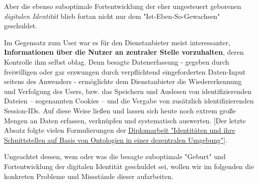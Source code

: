 \vspace{0.3cm}

Aber die ebenso suboptimale Fortentwicklung der eher ungesteuert geborenen \textit{digitalen Identität} blieb fortan nicht nur dem "Ist-Eben-So-Gewachsen" geschuldet.

Im Gegensatz zum User war es für den Dienstanbieter meist interessanter, \textbf{Informationen über die Nutzer an zentraler Stelle vorzuhalten}, deren Kontrolle ihm selbst oblag. Denn besagte Datenerfassung - gegeben durch freiwilligen oder gar erzwungen durch verpflichtend eingeforderten Daten-Input seitens des Anwenders - ermöglichte dem Dienstanbieter die Wiedererkennung und Verfolgung des Users, bzw. das Speichern und Auslesen von identifizierenden Dateien – sogenannten Cookies – und die Vergabe von zusätzlich identifizierenden Session-IDs. Auf diese Weise ließen und lassen sich heute noch extrem große Mengen an Daten erfassen, verknüpfen und systematisch auswerten. [Der letzte Absatz folgte vielen Formulierungen der \href{https://vsis-www.informatik.uni-hamburg.de/getDoc.php/thesis/47/DA_Gordian_Kaulbarsch.pdf}{Diplomarbeit "Identitäten und ihre Schnittstellen auf Basis von Ontologien in einer dezentralen Umgebung"}].

\vspace{0.3cm}

Ungeachtet dessen, wem oder was die besagte suboptimale "Geburt" und Fortentwicklung der digitalen Identität geschuldet sei, wollen wir im folgenden die konkreten Probleme und Missstände dieser aufarbeiten.

\vspace{0.3cm}

